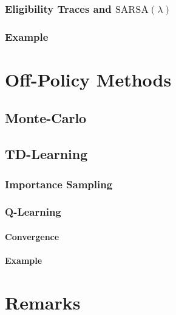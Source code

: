 			\subsubsection{Eligibility Traces and \( \text{SARSA}(\lambda) \)} %

			\subsubsection{Example} %

	\section{Off-Policy Methods} %

		\subsection{Monte-Carlo} %

		\subsection{TD-Learning} %

			\subsubsection{Importance Sampling} %

			\subsubsection{Q-Learning} %

				\paragraph{Convergence} %

				\paragraph{Example} %

	\section{Remarks} %

